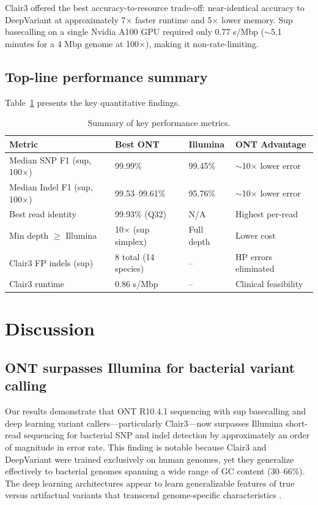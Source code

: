 \documentclass[11pt]{article}
\begin{document}
Clair3 offered the best accuracy-to-resource trade-off: near-identical accuracy to DeepVariant at approximately 7$\times$ faster runtime and 5$\times$ lower memory. Sup basecalling on a single Nvidia A100 GPU required only 0.77 s/Mbp ($\sim$5.1 minutes for a 4 Mbp genome at 100$\times$), making it non-rate-limiting.

\subsection{Top-line performance summary}

Table~\ref{tab:summary} presents the key quantitative findings.

\begin{table}[ht]
\centering
\caption{Summary of key performance metrics.}
\label{tab:summary}
\begin{tabular}{llll}
\toprule
Metric & Best ONT & Illumina & ONT Advantage \\
\midrule
Median SNP F1 (sup, 100$\times$) & 99.99\% & 99.45\% & $\sim$10$\times$ lower error \\
Median Indel F1 (sup, 100$\times$) & 99.53--99.61\% & 95.76\% & $\sim$10$\times$ lower error \\
Best read identity & 99.93\% (Q32) & N/A & Highest per-read \\
Min depth $\geq$ Illumina & 10$\times$ (sup simplex) & Full depth & Lower cost \\
Clair3 FP indels (sup) & 8 total (14 species) & -- & HP errors eliminated \\
Clair3 runtime & 0.86 s/Mbp & -- & Clinical feasibility \\
\bottomrule
\end{tabular}
\end{table}

\section{Discussion}

\subsection{ONT surpasses Illumina for bacterial variant calling}

Our results demonstrate that ONT R10.4.1 sequencing with sup basecalling and deep learning variant callers---particularly Clair3---now surpasses Illumina short-read sequencing for bacterial SNP and indel detection by approximately an order of magnitude in error rate. This finding is notable because Clair3 and DeepVariant were trained exclusively on human genomes, yet they generalize effectively to bacterial genomes spanning a wide range of GC content (30--66\%). The deep learning architectures appear to learn generalizable features of true versus artifactual variants that transcend genome-specific characteristics \citep{Zheng2022,Poplin2018}.
\end{document}
